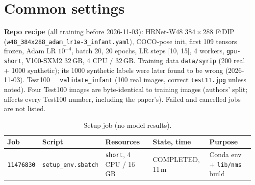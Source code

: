 \documentclass[10pt]{article}
\newcommand{\job}[1]{\texttt{#1}}
\begin{document}
\section*{Common settings}
\textbf{Repo recipe} (all training before 2026-11-03): HRNet-W48 $384\times288$ FiDIP
(\texttt{w48\_384x288\_adam\_lr1e-3\_infant.yaml}), COCO-pose init, first 109 tensors frozen,
Adam LR $10^{-4}$, batch 20, 20 epochs, LR steps [10, 15], 4 workers, \texttt{gpu-short}, V100-SXM2 32\,GB,
4 CPU / 32\,GB. Training data \texttt{data/syrip} (200 real + 1000 synthetic); its 1000 synthetic labels were
later found to be wrong (2026-11-03). Test100 = \texttt{validate\_infant} (100 real images, correct
\texttt{test11.jpg} unless noted). Four Test100 images are byte-identical to training images (authors' split;
affects every Test100 number, including the paper's). Failed and cancelled jobs are not listed.

\begin{table}[h]\centering\small
\caption{Setup job (no model results).}
\begin{tabular}{lllll}
\toprule
Job & Script & Resources & State, time & Purpose \\
\midrule
\job{11476830} & \texttt{setup\_env.sbatch} & \texttt{short}, 4 CPU / 16\,GB & COMPLETED, 11\,m & Conda env + \texttt{lib/nms} build \\
\bottomrule
\end{tabular}
\end{table}
\end{document}
